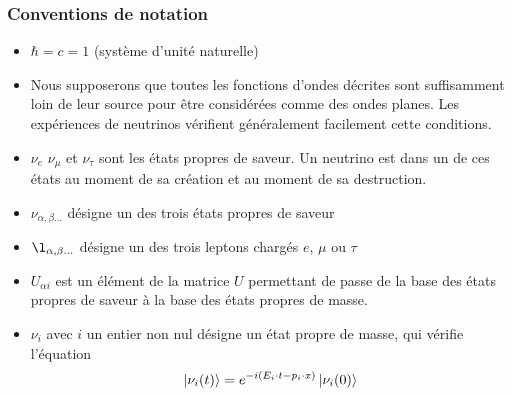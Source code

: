             \subsubsection{Conventions de notation}
            \begin{itemize}
                \item $\hbar = c = 1$ (système d'unité naturelle)
                \item Nous supposerons que toutes les fonctions d'ondes décrites sont suffisamment loin de leur source pour être considérées comme des ondes planes. Les expériences de neutrinos vérifient généralement facilement cette conditions.
                \item $\nu_e$ $\nu_{\mu}$ et $\nu_{\tau}$ sont les états propres de saveur. Un neutrino est dans un de ces états au moment de sa création et au moment de sa destruction.
                \item $\nu_{\alpha,\beta...}$ désigne un des trois états propres de saveur
                \item $\l_{\alpha,\beta...}$ désigne un des trois leptons chargés $e$, $\mu$ ou $\tau$
                \item $U_{\alpha i}$ est un élément de la matrice $U$ permettant de passe de la base des états propres de saveur à la base des états propres de masse.
                \item $\nu_{i}$ avec $i$ un entier non nul désigne un état propre de masse, qui vérifie l'équation
                \begin{equation}
                    \ket{\nu_i(t)} = e^{-i(E_i\cdot t - p_i\cdot x)}\ket{\nu_i(0)}
                \end{equation}
            \end{itemize}
            

